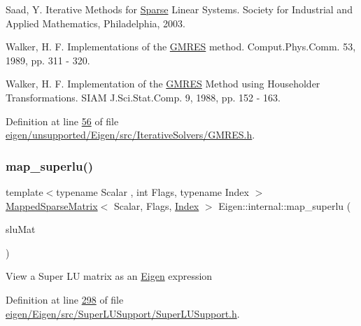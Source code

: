 Saad, Y. Iterative Methods for \hyperlink{struct_eigen_1_1_sparse}{Sparse} Linear Systems. Society for Industrial and Applied Mathematics, Philadelphia, 2003.

Walker, H. F. Implementations of the \hyperlink{group___iterative_linear_solvers___module_class_eigen_1_1_g_m_r_e_s}{G\+M\+R\+ES} method. Comput.\+Phys.\+Comm. 53, 1989, pp. 311 -\/ 320.

Walker, H. F. Implementation of the \hyperlink{group___iterative_linear_solvers___module_class_eigen_1_1_g_m_r_e_s}{G\+M\+R\+ES} Method using Householder Transformations. S\+I\+AM J.\+Sci.\+Stat.\+Comp. 9, 1988, pp. 152 -\/ 163. 

Definition at line \hyperlink{eigen_2unsupported_2_eigen_2src_2_iterative_solvers_2_g_m_r_e_s_8h_source_l00056}{56} of file \hyperlink{eigen_2unsupported_2_eigen_2src_2_iterative_solvers_2_g_m_r_e_s_8h_source}{eigen/unsupported/\+Eigen/src/\+Iterative\+Solvers/\+G\+M\+R\+E\+S.\+h}.

\mbox{\label{namespace_eigen_1_1internal_a3623dd66c579fac70fa26a40aae5061b}} 
\subsubsection{\texorpdfstring{map\+\_\+superlu()}{map\_superlu()}}
{\footnotesize\ttfamily template$<$typename Scalar , int Flags, typename Index $>$ \\
\hyperlink{class_eigen_1_1_mapped_sparse_matrix}{Mapped\+Sparse\+Matrix}$<$ Scalar, Flags, \hyperlink{namespace_eigen_a62e77e0933482dafde8fe197d9a2cfde}{Index} $>$ Eigen\+::internal\+::map\+\_\+superlu (\begin{DoxyParamCaption}\item[{\hyperlink{struct_eigen_1_1_slu_matrix}{Slu\+Matrix} \&}]{slu\+Mat }\end{DoxyParamCaption})}

View a Super LU matrix as an \hyperlink{namespace_eigen}{Eigen} expression 

Definition at line \hyperlink{eigen_2_eigen_2src_2_super_l_u_support_2_super_l_u_support_8h_source_l00298}{298} of file \hyperlink{eigen_2_eigen_2src_2_super_l_u_support_2_super_l_u_support_8h_source}{eigen/\+Eigen/src/\+Super\+L\+U\+Support/\+Super\+L\+U\+Support.\+h}.

